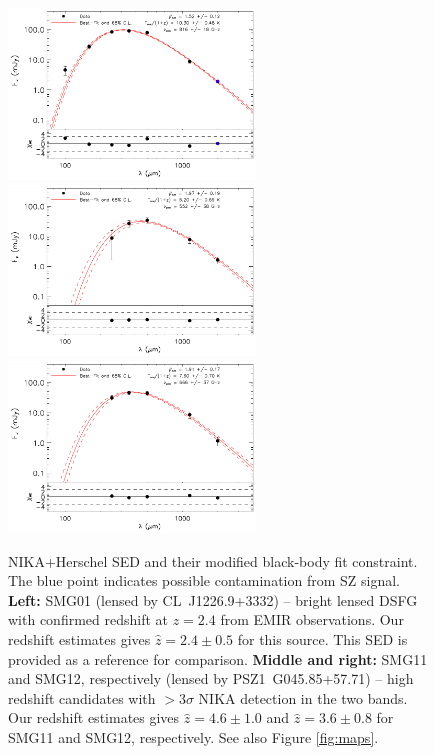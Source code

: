\documentclass[11pt,a4paper,twoside,graphicx,color]{article}
\begin{document}
\begin{figure}[h!]
	\centering
	\includegraphics[trim=0cm 0cm 0.18cm 0cm, clip=true, height=4.55cm]{SED_fit01.pdf}
	\includegraphics[trim=2.5cm 0cm 0.18cm 0cm, clip=true, height=4.55cm]{SED_fit11.pdf}
	\includegraphics[trim=2.5cm 0cm 0cm 0cm, clip=true, height=4.55cm]{SED_fit12.pdf}
	\caption{\footnotesize{NIKA+Herschel SED and their modified black-body fit constraint. The blue point indicates possible contamination from SZ signal. {\bf Left:} SMG01 (lensed by \mbox{CL~J1226.9+3332}) -- bright lensed DSFG with confirmed redshift at $z = 2.4$ from EMIR observations. Our redshift estimates gives $\hat{z} = 2.4 \pm 0.5$ for this source. This SED is provided as a reference for comparison. {\bf Middle and right:} SMG11 and SMG12, respectively (lensed by \mbox{PSZ1~G045.85+57.71}) -- high redshift candidates with $>3 \sigma$ NIKA detection in the two bands. Our redshift estimates gives $\hat{z} = 4.6 \pm 1.0$ and $\hat{z} = 3.6 \pm 0.8$ for SMG11 and SMG12, respectively. See also Figure \ref{fig:maps}.}}
	\label{fig:SED} 
\end{figure}
\end{document}
